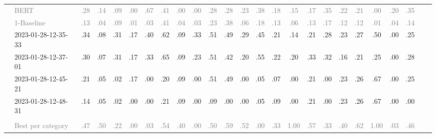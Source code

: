 \begin{table*}
\begin{tabular}{@{}ll@{\hspace{10pt}}c@{\hspace{5pt}}cccccccccccccccccccccc@{}}
& \textcolor{gray}{BERT} & \textcolor{gray}{.28} & \textcolor{gray}{.14} & \textcolor{gray}{.09} & \textcolor{gray}{.00} & \textcolor{gray}{.67} & \textcolor{gray}{.41} & \textcolor{gray}{.00} & \textcolor{gray}{.00} & \textcolor{gray}{.28} & \textcolor{gray}{.28} & \textcolor{gray}{.23} & \textcolor{gray}{.38} & \textcolor{gray}{.18} & \textcolor{gray}{.15} & \textcolor{gray}{.17} & \textcolor{gray}{.35} & \textcolor{gray}{.22} & \textcolor{gray}{.21} & \textcolor{gray}{.00} & \textcolor{gray}{.20} & \textcolor{gray}{.35} \\
& \textcolor{gray}{1-Baseline} & \textcolor{gray}{.13} & \textcolor{gray}{.04} & \textcolor{gray}{.09} & \textcolor{gray}{.01} & \textcolor{gray}{.03} & \textcolor{gray}{.41} & \textcolor{gray}{.04} & \textcolor{gray}{.03} & \textcolor{gray}{.23} & \textcolor{gray}{.38} & \textcolor{gray}{.06} & \textcolor{gray}{.18} & \textcolor{gray}{.13} & \textcolor{gray}{.06} & \textcolor{gray}{.13} & \textcolor{gray}{.17} & \textcolor{gray}{.12} & \textcolor{gray}{.12} & \textcolor{gray}{.01} & \textcolor{gray}{.04} & \textcolor{gray}{.14} \\
& 2023-01-28-12-35-33 & .34 & .08 & .31 & .17 & .40 & .62 & .09 & .33 & .51 & .49 & .29 & .45 & .21 & .14 & .21 & .28 & .23 & .27 & .50 & .00 & .25 \\
& 2023-01-28-12-37-01 & .30 & .07 & .31 & .17 & .33 & .65 & .09 & .23 & .51 & .42 & .20 & .55 & .22 & .20 & .33 & .32 & .16 & .21 & .25 & .00 & .28 \\
& 2023-01-28-12-45-21 & .21 & .05 & .02 & .17 & .00 & .20 & .09 & .00 & .51 & .49 & .00 & .05 & .07 & .00 & .21 & .00 & .23 & .26 & .67 & .00 & .25 \\
& 2023-01-28-12-48-31 & .14 & .05 & .02 & .00 & .00 & .21 & .09 & .00 & .09 & .00 & .00 & .05 & .09 & .00 & .21 & .00 & .23 & .26 & .67 & .00 & .00 \\
\addlinespace
\multicolumn{2}{@{}l}{\emph{New York Times}} \\
& \textcolor{gray}{Best per category} & \textcolor{gray}{.47} & \textcolor{gray}{.50} & \textcolor{gray}{.22} & \textcolor{gray}{.00} & \textcolor{gray}{.03} & \textcolor{gray}{.54} & \textcolor{gray}{.40} & \textcolor{gray}{.00} & \textcolor{gray}{.50} & \textcolor{gray}{.59} & \textcolor{gray}{.52} & \textcolor{gray}{.00} & \textcolor{gray}{.33} & \textcolor{gray}{1.00} & \textcolor{gray}{.57} & \textcolor{gray}{.33} & \textcolor{gray}{.40} & \textcolor{gray}{.62} & \textcolor{gray}{1.00} & \textcolor{gray}{.03} & \textcolor{gray}{.46} \\

\end{tabular}
\end{table*}

